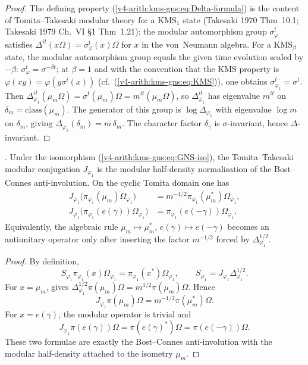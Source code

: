 \begin{proof}
The defining property (\ref{v4-arith:kms-gns:eq:Delta-formula}) is the
content of Tomita--Takesaki modular theory for a KMS\({}_{1}\) state
(Takesaki 1970 Thm~10.1; Takesaki 1979 Ch.~VI \S1 Thm~1.21): the
modular automorphism group \(\sigma^{t}_{\varphi}\) satisfies
\(\Delta^{it}(x\Omega)=\sigma^{t}_{\varphi}(x)\Omega\) for \(x\) in
the von~Neumann algebra. For a KMS\({}_{\beta}\) state, the modular
automorphism group equals the given time evolution scaled by \(-\beta\):
\(\sigma^{t}_{\varphi}=\sigma^{-\beta t}\); at \(\beta=1\) and with
the convention that the KMS property is \(\varphi(xy)=\varphi(y\sigma^{i}(x))\)
(cf.~(\ref{v4-arith:kms-gns:eq:KMS})), one obtains
\(\sigma^{t}_{\varphi_{1}}=\sigma^{t}\). Then
\(\Delta_{\varphi_{1}}^{it}(\mu_{m}\Omega)=\sigma^{t}(\mu_{m})\Omega=m^{it}(\mu_{m}\Omega)\),
so \(\Delta_{\varphi_{1}}^{it}\) has eigenvalue \(m^{it}\) on
\(\delta_{m}=\mathrm{class}(\mu_{m})\). The generator of this group is
\(\log\Delta_{\varphi_{1}}\) with eigenvalue \(\log m\) on
\(\delta_{m}\), giving \(\Delta_{\varphi_{1}}(\delta_{m})=m\,\delta_{m}\).
The character factor \(\delta_{\gamma}\) is \(\sigma\)-invariant, hence
\(\Delta\)-invariant.
\end{proof}

\begin{proposition}
\label{v4-arith:kms-gns:prop:J-equals-sigma-BC}
\ClaimStatusProvedHere. Under the isomorphism
(\ref{v4-arith:kms-gns:eq:GNS-iso}), the Tomita--Takesaki modular
conjugation \(J_{\varphi_{1}}\) is the modular half-density
normalisation of the Bost--Connes anti-involution. On the cyclic
Tomita domain one has
\begin{align}
\label{v4-arith:kms-gns:eq:J-basis}
J_{\varphi_{1}}\bigl(\pi_{\varphi_{1}}(\mu_m)\Omega_{\varphi_{1}}\bigr)
&=m^{-1/2}\pi_{\varphi_{1}}(\mu_m^{*})\Omega_{\varphi_{1}},\\
\label{v4-arith:kms-gns:eq:J-on-algebra}
J_{\varphi_{1}}\bigl(\pi_{\varphi_{1}}(e(\gamma))\Omega_{\varphi_{1}}\bigr)
&=\pi_{\varphi_{1}}(e(-\gamma))\Omega_{\varphi_{1}}.\nonumber
\end{align}
Equivalently, the algebraic rule
\(\mu_m\mapsto\mu_m^{*}\), \(e(\gamma)\mapsto e(-\gamma)\) becomes an
antiunitary operator only after inserting the factor \(m^{-1/2}\)
forced by \(\Delta_{\varphi_{1}}^{1/2}\).
\end{proposition}

\begin{proof}
By definition,
\[
S_{\varphi_{1}}\pi_{\varphi_{1}}(x)\Omega_{\varphi_{1}}
=\pi_{\varphi_{1}}(x^{*})\Omega_{\varphi_{1}},
\qquad
S_{\varphi_{1}}=J_{\varphi_{1}}\Delta_{\varphi_{1}}^{1/2}.
\]
For \(x=\mu_m\),  gives
\(\Delta_{\varphi_{1}}^{1/2}\pi(\mu_m)\Omega=m^{1/2}\pi(\mu_m)\Omega\).
Hence
\[
J_{\varphi_{1}}\pi(\mu_m)\Omega
=m^{-1/2}\pi(\mu_m^{*})\Omega .
\]
For \(x=e(\gamma)\), the modular operator is trivial and
\[
J_{\varphi_{1}}\pi(e(\gamma))\Omega
=\pi(e(\gamma)^{*})\Omega
=\pi(e(-\gamma))\Omega .
\]
These two formulae are exactly the Bost--Connes anti-involution with
the modular half-density attached to the isometry \(\mu_m\).
\end{proof}

